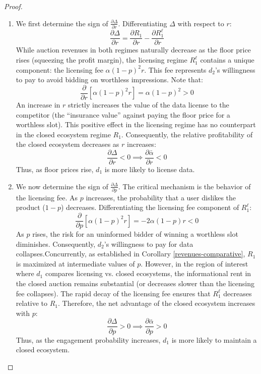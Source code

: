\begin{proof}
    \begin{enumerate}
        \item We first determine the sign of $\frac{\partial \Delta}{\partial r}$. Differentiating $\Delta$ with respect to $r$:
    \begin{equation*}
        \frac{\partial \Delta}{\partial r} = \frac{\partial R_1}{\partial r} - \frac{\partial R_1^\ell}{\partial r}
    \end{equation*}
    While auction revenues in both regimes naturally decrease as the floor price rises (squeezing the profit margin), the licensing regime $R_1^\ell$ contains a unique component: the licensing fee $\alpha(1-p)^2 r$. This fee represents $d_2$'s willingness to pay to avoid bidding on worthless impressions. Note that:
    \[
        \frac{\partial}{\partial r} \left[ \alpha(1-p)^2 r \right] = \alpha(1-p)^2 > 0
    \]
    An increase in $r$ strictly increases the value of the data license to the competitor (the ``insurance value'' against paying the floor price for a worthless slot). This positive effect in the licensing regime has no counterpart in the closed ecosystem regime $R_1$. Consequently, the relative profitability of the closed ecosystem decreases as $r$ increases:
    \[
        \frac{\partial \Delta}{\partial r} < 0 \implies \frac{\partial \bar{\alpha}}{\partial r} < 0
    \]
    Thus, as floor prices rise, $d_1$ is more likely to license data.
    \item We now determine the sign of $\frac{\partial \Delta}{\partial p}$. The critical mechanism is the behavior of the licensing fee. As $p$ increases, the probability that a user dislikes the product ($1-p$) decreases.
    Differentiating the licensing fee component of $R_1^\ell$:
    \begin{equation*}
        \frac{\partial}{\partial p} \left[ \alpha(1-p)^2 r \right] = -2\alpha(1-p)r < 0
    \end{equation*}
    As $p$ rises, the risk for an uninformed bidder of winning a worthless slot diminishes. Consequently, $d_2$'s willingness to pay for data collapses.Concurrently, as established in Corollary \ref{revenues-comparative}, $R_1$ is maximized at intermediate values of $p$. However, in the region of interest where $d_1$ compares licensing vs. closed ecosystems, the informational rent in the closed auction remains substantial (or decreases slower than the licensing fee collapses). The rapid decay of the licensing fee ensures that $R_1^\ell$ decreases relative to $R_1$. Therefore, the net advantage of the closed ecosystem increases with $p$:
    \[
        \frac{\partial \Delta}{\partial p} > 0 \implies \frac{\partial \bar{\alpha}}{\partial p} > 0
    \]
    Thus, as the engagement probability increases, $d_1$ is more likely to maintain a closed ecosystem.

    \end{enumerate}
\end{proof}

